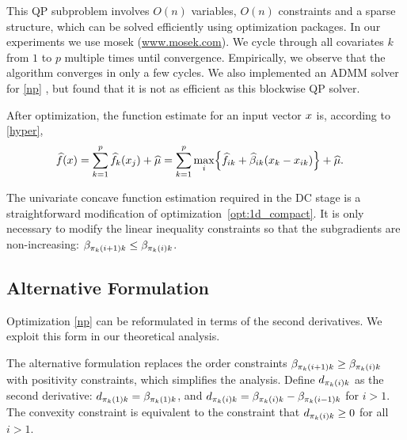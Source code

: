 This QP
subproblem involves $O(n)$ variables, $O(n)$ constraints and a sparse
structure, which can be solved efficiently using optimization
packages. In our experiments we use {\sc mosek} (\href{http://www.mosek.com/}{www.mosek.com}).  We cycle through
all covariates $k$ from $1$ to $p$ multiple times until convergence.
Empirically, we observe that the algorithm converges in only a few
cycles. We also implemented an ADMM solver for \eqref{np}
\citep{Boyd:admm}, but found
that it is not as efficient as this blockwise QP solver.

After optimization, the function estimate for an input vector $x$ is, according to \eqref{hyper},
\begin{equation}
\begin{split}
      \widehat f(x) & = \sum_{k=1}^{p} \widehat f_k(x_{j})+ \widehat \mu 
= \sum_{k=1}^{p}\max_{i} \Bigl\{\widehat f_{ik}+ \widehat \beta_{ik}(x_{k}-x_{ik})\Bigr\} +
      \widehat \mu.
\end{split}
\end{equation} 

The univariate concave function estimation required in the DC stage is a straightforward
modification of optimization~\eqref{opt:1d_compact}. It is only
necessary to modify the linear inequality constraints so that the subgradients are
non-increasing: $\beta_{\pi_k(i+1)k} \leq \beta_{\pi_k(i)k}$.


\subsection{Alternative Formulation}
Optimization \eqref{np} can be reformulated in terms of the second
derivatives.  We exploit this form in our theoretical analysis. 

The alternative formulation replaces the order constraints
$\beta_{\pi_k(i+1)k} \geq \beta_{\pi_k(i)k}$ with positivity constraints, which
simplifies the analysis.  Define $d_{\pi_k(i)k}$ as the second
derivative: $d_{\pi_k(1)k} = \beta_{\pi_k(1)k}$, and $d_{\pi_k(i)k} = \beta_{\pi_k(i)k} -
\beta_{\pi_k(i-1)k}$ for $i > 1$. The convexity constraint is equivalent to the
constraint that $d_{\pi_k(i)k} \geq 0$ for all $i > 1$.

